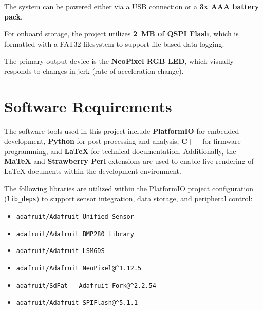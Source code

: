 \documentclass[12pt]{report}
\begin{document}
The system can be powered either via a USB connection or a \textbf{3x AAA battery pack}.

For onboard storage, the project utilizes \textbf{2~MB of QSPI Flash}, which is formatted with a FAT32 filesystem to support file-based data logging.

The primary output device is the \textbf{NeoPixel RGB LED}, which visually responds to changes in jerk (rate of acceleration change).

\chapter{Software Requirements}
The software tools used in this project include \textbf{PlatformIO} for embedded development, \textbf{Python} for post-processing and analysis, \textbf{C++} for firmware programming, and \textbf{LaTeX} for technical documentation. Additionally, the \textbf{MaTeX} and \textbf{Strawberry Perl} extensions are used to enable live rendering of LaTeX documents within the development environment.

The following libraries are utilized within the PlatformIO project configuration (\texttt{lib\_deps}) to support sensor integration, data storage, and peripheral control:

\begin{itemize}
    \item \texttt{adafruit/Adafruit Unified Sensor}
    \item \texttt{adafruit/Adafruit BMP280 Library}
    \item \texttt{adafruit/Adafruit LSM6DS}
    \item \texttt{adafruit/Adafruit NeoPixel@\^{}1.12.5}
    \item \texttt{adafruit/SdFat - Adafruit Fork@\^{}2.2.54}
    \item \texttt{adafruit/Adafruit SPIFlash@\^{}5.1.1}
\end{itemize}
\end{document}
